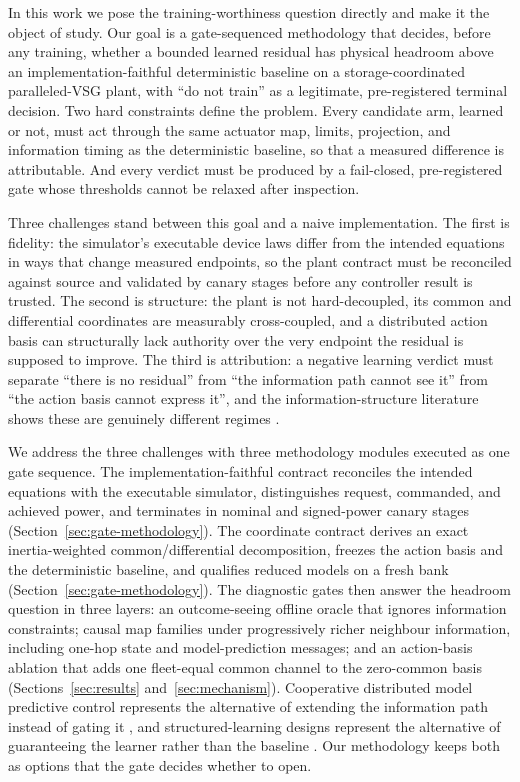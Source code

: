 \documentclass[journal]{IEEEtran}
\begin{document}
In this work we pose the training-worthiness question directly and make it the object of study. Our goal is a gate-sequenced methodology that decides, before any training, whether a bounded learned residual has physical headroom above an implementation-faithful deterministic baseline on a storage-coordinated paralleled-VSG plant, with ``do not train'' as a legitimate, pre-registered terminal decision. Two hard constraints define the problem. Every candidate arm, learned or not, must act through the same actuator map, limits, projection, and information timing as the deterministic baseline, so that a measured difference is attributable. And every verdict must be produced by a fail-closed, pre-registered gate whose thresholds cannot be relaxed after inspection.

Three challenges stand between this goal and a naive implementation. The first is fidelity: the simulator's executable device laws differ from the intended equations in ways that change measured endpoints, so the plant contract must be reconciled against source and validated by canary stages before any controller result is trusted. The second is structure: the plant is not hard-decoupled, its common and differential coordinates are measurably cross-coupled, and a distributed action basis can structurally lack authority over the very endpoint the residual is supposed to improve. The third is attribution: a negative learning verdict must separate ``there is no residual'' from ``the information path cannot see it'' from ``the action basis cannot express it'', and the information-structure literature shows these are genuinely different regimes \cite{dobbe2017fully,ho1980team}.

We address the three challenges with three methodology modules executed as one gate sequence. The implementation-faithful contract reconciles the intended equations with the executable simulator, distinguishes request, commanded, and achieved power, and terminates in nominal and signed-power canary stages (Section~\ref{sec:gate-methodology}). The coordinate contract derives an exact inertia-weighted common/differential decomposition, freezes the action basis and the deterministic baseline, and qualifies reduced models on a fresh bank (Section~\ref{sec:gate-methodology}). The diagnostic gates then answer the headroom question in three layers: an outcome-seeing offline oracle that ignores information constraints; causal map families under progressively richer neighbour information, including one-hop state and model-prediction messages; and an action-basis ablation that adds one fleet-equal common channel to the zero-common basis (Sections~\ref{sec:results} and~\ref{sec:mechanism}). Cooperative distributed model predictive control represents the alternative of extending the information path instead of gating it \cite{stewart2010cooperative,conte2016distributed,lin2024power}, and structured-learning designs represent the alternative of guaranteeing the learner rather than the baseline \cite{kwon2023risk}. Our methodology keeps both as options that the gate decides whether to open.
\end{document}

